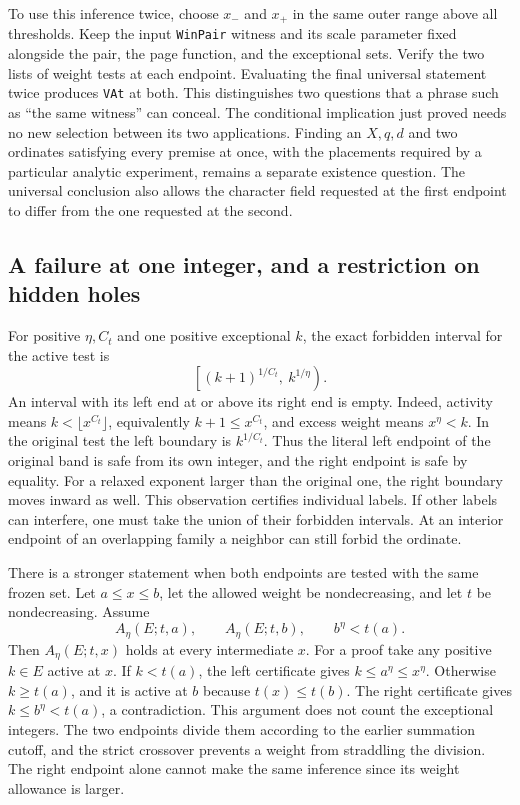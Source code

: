 \documentclass[12pt,letterpaper]{article}
\begin{document}
To use this inference twice, choose $x_-$ and $x_+$ in the same outer range above all thresholds. Keep the input \texttt{WinPair} witness and its scale parameter fixed alongside the pair, the page function, and the exceptional sets. Verify the two lists of weight tests at each endpoint. Evaluating the final universal statement twice produces \texttt{VAt} at both. This distinguishes two questions that a phrase such as ``the same witness'' can conceal. The conditional implication just proved needs no new selection between its two applications. Finding an $X,q,d$ and two ordinates satisfying every premise at once, with the placements required by a particular analytic experiment, remains a separate existence question. The universal conclusion also allows the character field requested at the first endpoint to differ from the one requested at the second.

\subsection{A failure at one integer, and a restriction on hidden holes}

For positive $\eta,C_t$ and one positive exceptional $k$, the exact forbidden interval for the active test is
\[
   \left[(k+1)^{1/C_t},\ k^{1/\eta}\right).
\]
An interval with its left end at or above its right end is empty. Indeed, activity means $k<\lfloor x^{C_t}\rfloor$, equivalently $k+1\leq x^{C_t}$, and excess weight means $x^\eta<k$. In the original test the left boundary is $k^{1/C_t}$. Thus the literal left endpoint of the original band is safe from its own integer, and the right endpoint is safe by equality. For a relaxed exponent larger than the original one, the right boundary moves inward as well. This observation certifies individual labels. If other labels can interfere, one must take the union of their forbidden intervals. At an interior endpoint of an overlapping family a neighbor can still forbid the ordinate.

There is a stronger statement when both endpoints are tested with the same frozen set. Let $a\leq x\leq b$, let the allowed weight be nondecreasing, and let $t$ be nondecreasing. Assume
\[
       A_\eta(E;t,a),\qquad A_\eta(E;t,b),\qquad
       b^\eta<t(a).
\]
Then $A_\eta(E;t,x)$ holds at every intermediate $x$. For a proof take any positive $k\in E$ active at $x$. If $k<t(a)$, the left certificate gives $k\leq a^\eta\leq x^\eta$. Otherwise $k\geq t(a)$, and it is active at $b$ because $t(x)\leq t(b)$. The right certificate gives $k\leq b^\eta<t(a)$, a contradiction. This argument does not count the exceptional integers. The two endpoints divide them according to the earlier summation cutoff, and the strict crossover prevents a weight from straddling the division. The right endpoint alone cannot make the same inference since its weight allowance is larger.
\end{document}
